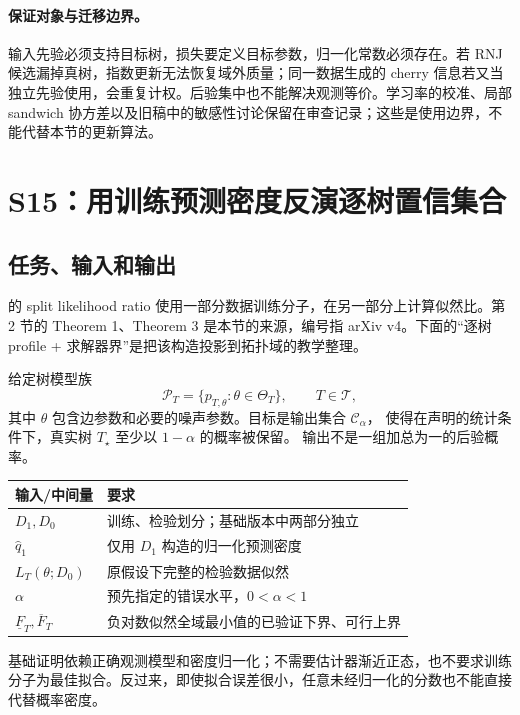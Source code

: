 \paragraph{保证对象与迁移边界。}
输入先验必须支持目标树，损失要定义目标参数，归一化常数必须存在。若 RNJ 候选漏掉真树，指数更新无法恢复域外质量；同一数据生成的 cherry 信息若又当独立先验使用，会重复计权。后验集中也不能解决观测等价。学习率的校准、局部 sandwich 协方差以及旧稿中的敏感性讨论保留在审查记录；这些是使用边界，不能代替本节的更新算法。

\section{S15：用训练预测密度反演逐树置信集合}
\label{sec:textbook-S15}

\subsection{任务、输入和输出}

\citet{S15} 的 split likelihood ratio 使用一部分数据训练分子，在另一部分上计算似然比。第 2 节的 Theorem 1、Theorem 3 是本节的来源，编号指 arXiv v4。下面的“逐树 profile + 求解器界”是把该构造投影到拓扑域的教学整理。

给定树模型族
\[
 \mathcal P_T=\{p_{T,\theta}:\theta\in\Theta_T\},\qquad T\in\mathcal T,
\]
其中 $\theta$ 包含边参数和必要的噪声参数。目标是输出集合 $\mathcal C_\alpha$，
使得在声明的统计条件下，真实树 $T_\star$ 至少以 $1-\alpha$ 的概率被保留。
输出不是一组加总为一的后验概率。

\begin{center}
\begin{tabularx}{\linewidth}{lX}
\toprule
输入/中间量 & 要求\\
\midrule
$D_1,D_0$ & 训练、检验划分；基础版本中两部分独立\\
$\widehat q_1$ & 仅用 $D_1$ 构造的归一化预测密度\\
$L_T(\theta;D_0)$ & 原假设下完整的检验数据似然\\
$\alpha$ & 预先指定的错误水平，$0<\alpha<1$\\
$\underline F_T,\overline F_T$ & 负对数似然全域最小值的已验证下界、可行上界\\
\bottomrule
\end{tabularx}
\end{center}

基础证明依赖正确观测模型和密度归一化；不需要估计器渐近正态，也不要求训练分子为最佳拟合。反过来，即使拟合误差很小，任意未经归一化的分数也不能直接代替概率密度。

